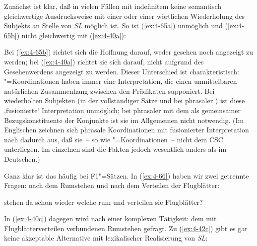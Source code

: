 \documentclass[output=paper]{langsci/langscibook}
\begin{document}
Zunächst ist klar, daß in vielen Fällen mit indefinitem  keine semantisch gleichwertige Ausdrucksweise mit einer  oder einer wörtlichen Wiederholung des Subjekts an Stelle von \textit{SL} möglich ist. So ist (\ref{ex:4-65a}) unmöglich und (\ref{ex:4-65b}) nicht gleichwertig mit (\ref{ex:4-40a}):

\begin{exe}
\ex
\label{ex:4-65}
\begin{xlist}

\end{xlist}
\end{exe}
Bei (\ref{ex:4-65b}) richtet sich die Hoffnung darauf, weder gesehen
noch angezeigt zu werden; bei (\ref{ex:4-40a}) richtet sie sich
darauf, nicht aufgrund des Gesehenwerdens angezeigt zu werden. Dieser
Unterschied ist charakteristisch: "=Koordinationen haben immer eine
Interpretation, die einen unmittelbaren natürlichen Zusammenhang
zwischen den Prädikaten supponiert. Bei wiederholten Subjekten (in der
 vollständiger Sätze und bei phrasaler ) ist
diese ‚fusionierte‘ Interpretation unmöglich; bei phrasaler
 mit dem  als gemeinsamer Bezugskonstituente der
Konjunkte ist sie im Allgemeinen nicht notwendig. (Im Englischen zeichnen sich
phrasale Koordinationen mit fusionierter Interpretation nach
\citet{Hutchinson1975} dadurch aus, daß sie~-- so wie
"=Koordinationen~-- nicht dem CSC unterliegen. Im einzelnen sind
die Fakten jedoch wesentlich anders als im Deutschen.)

Ganz klar ist das häufig bei F1"=Sätzen. In (\ref{ex:4-66}) haben wir zwei getrennte Fragen: nach dem Rumstehen und nach dem Verteilen der Flugblätter:


\begin{exe}
\ex%
\label{ex:4-66}
stehen da schon wieder welche rum und verteilen sie Flugblätter?
\end{exe}
In (\ref{ex:4-40c}) dagegen wird nach einer komplexen Tätigkeit: dem mit Flugblätterverteilen verbundenen Rumstehen gefragt. Zu (\ref{ex:4-42c}) gibt es gar keine akzeptable Alternative mit lexikalischer Realisierung von \textit{SL}:
\end{document}
